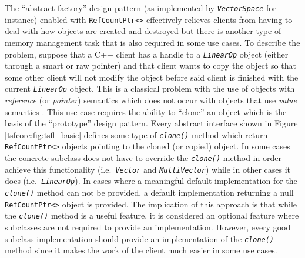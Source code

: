 The ``abstract factory'' design pattern (as implemented by
{}\texttt{\textit{VectorSpace}} for instance) enabled with
{}\texttt{RefCountPtr<>} effectively relieves clients from having to
deal with how objects are created and destroyed but there is another
type of memory management task that is also required in some use
cases.  To describe the problem, suppose that a C++ client has a
handle to a {}\texttt{\textit{LinearOp}} object (either through a
smart or raw pointer) and that client wants to copy the object so that
some other client will not modify the object before said client is
finished with the current {}\texttt{\textit{LinearOp}} object.  This
is a classical problem with the use of objects with {\em reference}
(or {\em pointer}) semantics which does not occur with objects that
use {\em value} semantics {}\cite{ref:stroustrup_1997}.  This use case
requires the ability to ``clone'' an object which is the basis of the
``prototype'' design pattern.  Every abstract interface shown in
Figure {}\ref{tsfcore:fig:tsfl_basic} defines some type of
{}\texttt{\textit{clone()}} method which return
{}\texttt{RefCountPtr<>} objects pointing to the cloned (or copied)
object.  In some cases the concrete subclass does not have to override
the {}\texttt{\textit{clone()}} method in order achieve this
functionality (i.e.~\texttt{\textit{Vector}} and
{}\texttt{\textit{Multi\-Vector}}) while in other cases it does
(i.e.~\texttt{\textit{LinearOp}}).  In cases where a meaningful
default implementation for the {}\texttt{\textit{clone()}} method can
not be provided, a default implementation returning a null
{}\texttt{RefCountPtr<>} object is provided.  The implication of this
approach is that while the {}\texttt{\textit{clone()}} method is a
useful feature, it is considered an optional feature where subclasses
are not required to provide an implementation.  However, every good
subclass implementation should provide an implementation of the
{}\texttt{\textit{clone()}} method since it makes the work of the
client much easier in some use cases.
	
